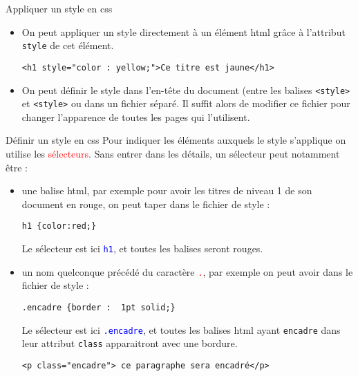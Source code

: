 \documentclass[10pt]{beamer}
\begin{document}
\begin{frame}[fragile]
	\mframe{\Web}
	\begin{alertblock}{Appliquer un style en css}
		\begin{itemize}[label=\textbullet]
			\item<1-> On peut appliquer un style directement à un élément html grâce à l'attribut {\tt style} de cet élément.
			      \begin{lstlisting}
<h1 style="color : yellow;">Ce titre est jaune</h1>
\end{lstlisting}
			\item<3-> On peut définir le style dans l'en-tête du document (entre les balises {\tt <style>} et {\tt <style>} ou dans un fichier séparé. Il suffit alors de modifier ce fichier pour changer l'apparence de toutes les pages qui l'utilisent.

		\end{itemize}
	\end{alertblock}
\end{frame}

\begin{frame}[fragile]
	\mframe{\Web}
	\begin{alertblock}{Définir un style en css}
		\onslide<1-> Pour indiquer les éléments auxquels le style s'applique on utilise les \textcolor{red}{sélecteurs}. Sans entrer dans les détails, un sélecteur peut notamment être :
		\begin{itemize}[label=\textbullet]
			\item<2-> une balise html, par exemple pour avoir les titres de niveau 1 de son document en rouge, on peut taper dans le fichier de style :
			      \begin{lstlisting}
h1 {color:red;}
\end{lstlisting}
			      Le sélecteur est ici \textcolor{blue}{\tt h1}, et toutes les balises {\tt <h1>} seront rouges.
			\item<3-> un nom quelconque précédé du caractère \textcolor{red}{\tt .}, par exemple on peut avoir dans le fichier de style :
			      \begin{lstlisting}
.encadre {border :  1pt solid;}
\end{lstlisting}
			      Le sélecteur est ici \textcolor{blue}{\tt .encadre}, et toutes les balises html ayant {\tt encadre} dans leur attribut {\tt class} apparaitront avec une bordure.
			      \begin{lstlisting}
<p class="encadre"> ce paragraphe sera encadré</p>
\end{lstlisting}
		\end{itemize}
	\end{alertblock}
\end{frame}
\end{document}
